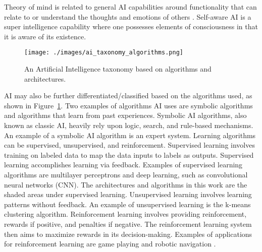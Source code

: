 Theory of mind is related to general AI capabilities around functionality that
can relate to or understand the thoughts and emotions of others
\cite{cuzzolin2020knowing}. Self-aware AI is a super intelligence capability
where one possesses elements of consciousness in that it is aware of its
existence\cite{russell2016artificial}.

\begin{figure}[h]
    \centering
    \texttt{[image: ./images/ai\_taxonomy\_algorithms.png]}
    \caption{An Artificial Intelligence taxonomy based on algorithms and architectures.}
    \label{fig:ai_taxonomy_algo}
\end{figure}

AI may also be further differentiated/classified based on the algorithms used,
as shown in Figure~\ref{fig:ai_taxonomy_algo}. Two examples of algorithms AI
uses are symbolic algorithms and algorithms that learn from past experiences.
Symbolic AI algorithms, also known as classic AI, heavily rely upon logic,
search, and rule-based mechanisms. An example of a symbolic AI algorithm is an
expert system. Learning algorithms can be supervised, unsupervised, and
reinforcement. Supervised learning involves training on labeled data to map the
data inputs to labels as outputs. Supervised learning accomplishes learning via
feedback. Examples of supervised learning algorithms are multilayer perceptrons
and deep learning, such as convolutional neural networks (CNN). The
architectures and algorithms in this work are the shaded areas under supervised
learning. Unsupervised learning involves learning patterns without feedback. An
example of unsupervised learning is the k-means clustering algorithm.
Reinforcement learning involves providing reinforcement, rewards if positive,
and penalties if negative. The reinforcement learning system then aims to
maximize rewards in its decision-making. Examples of applications for
reinforcement learning are game playing and robotic navigation \cite
{russell2016artificial}.



